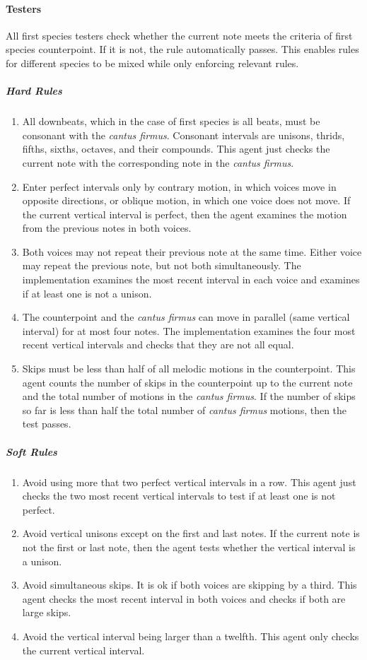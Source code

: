 \paragraph{Testers}
All first species testers check whether the current note meets the criteria of first species counterpoint. If it is not, the rule automatically passes.
This enables rules for different species to be mixed while only enforcing relevant rules.
\subparagraph{Hard Rules}
	\begin{enumerate}
		\item All downbeats, which in the case of first species is all beats, must be consonant with the \emph{cantus firmus}. 
					Consonant intervals are unisons, thrids, fifths, sixths, octaves, and their compounds.
					This agent just checks the current note with the corresponding note in the \emph{cantus firmus}.

		\item Enter perfect intervals only by contrary motion, in which voices move in opposite directions, or oblique motion, in which one voice does not move.
					If the current vertical interval is perfect, then the agent examines the motion from the previous notes in both voices.

		\item Both voices may not repeat their previous note at the same time. Either voice may repeat the previous note, but not both simultaneously.
          The implementation examines the most recent interval in each voice and examines if at least one is not a unison.

		\item The counterpoint and the \emph{cantus firmus} can move in parallel (same vertical interval) for at most four notes.
          The implementation examines the four most recent vertical intervals and checks that they are not all equal.

		\item Skips must be less than half of all melodic motions in the counterpoint.
          This agent counts the number of skips in the counterpoint up to the current note and the total number of motions in the \emph{cantus firmus}.
          If the number of skips so far is less than half the total number of \emph{cantus firmus} motions, then the test passes.

	\end{enumerate}
\subparagraph{Soft Rules}
	\begin{enumerate}
		\item Avoid using more that two perfect vertical intervals in a row. This agent just checks the two most recent vertical intervals to test if at least one is not perfect.
		\item Avoid vertical unisons except on the first and last notes. If the current note is not the first or last note, then the agent tests whether the vertical interval is a unison.
		\item Avoid simultaneous skips. It is ok if both voices are skipping by a third. This agent checks the most recent interval in both voices and checks if both are large skips.
		\item Avoid the vertical interval being larger than a twelfth. This agent only checks the current vertical interval.
	\end{enumerate}
